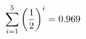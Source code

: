 \documentclass[preview]{standalone}
\begin{document}
\begin{align*}
\sum_{i=1}^{ 5 } \left({ 1 } \over {2} \right)^i = { 0.969 }
\end{align*}
\end{document}
